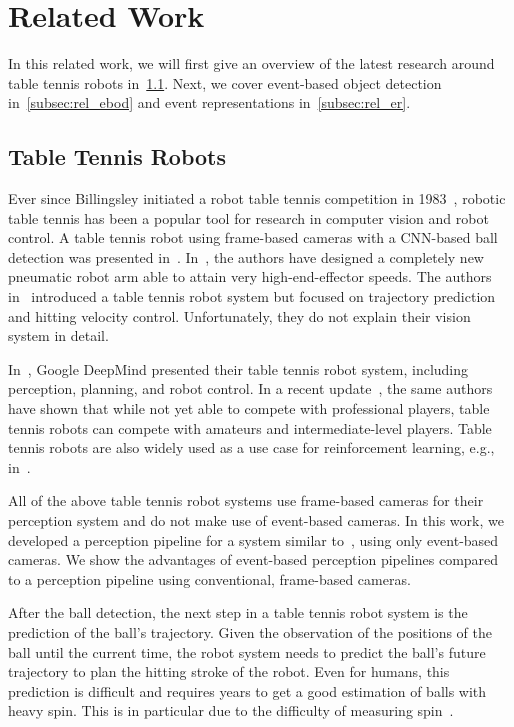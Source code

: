 \section{Related Work}
In this related work, we will first give an overview of the latest research around table tennis robots in~\cref{subsec:rl_ttr}.
%
Next, we cover event-based object detection in~\cref{subsec:rel_ebod} and event representations in~\cref{subsec:rel_er}.

\subsection{Table Tennis Robots}\label{subsec:rl_ttr}

Ever since Billingsley initiated a robot table tennis competition in 1983~\cite{Billingsley1983robot}, robotic table tennis has been a popular tool for research in computer vision and robot control.
%
A table tennis robot using frame-based cameras with a \ac{CNN}-based ball detection was presented in~\cite{GomezGonzalez2019robotics}.
In~\cite{Buchler2022tor}, the authors have designed a completely new pneumatic robot arm able to attain very high-end-effector speeds.
%
The authors in~\cite{Ji2021iros} introduced a table tennis robot system but focused on trajectory prediction and hitting velocity control.
%
Unfortunately, they do not explain their vision system in detail.

In~\cite{DAmbrosio2023rss}, Google DeepMind presented their table tennis robot system, including perception, planning, and robot control.
%
In a recent update~\cite{Ambrosio2024arxiv}, the same authors have shown that while not yet able to compete with professional players, table tennis robots can compete with amateurs and intermediate-level players.
%
Table tennis robots are also widely used as a use case for reinforcement learning, e.g., in~\cite{DAmbrosio2023rss}\cite{Ding2022iros}\cite{Yang2021ieee}\cite{Gao2020iros}.

All of the above table tennis robot systems use frame-based cameras for their perception system and do not make use of event-based cameras.
%
In this work, we developed a perception pipeline for a system similar to~\cite{Tebbe2019gcpr}, using only event-based cameras.
%
We show the advantages of event-based perception pipelines compared to a perception pipeline using conventional, frame-based cameras.

After the ball detection, the next step in a table tennis robot system is the prediction of the ball's trajectory.
%
Given the observation of the positions of the ball until the current time, the robot system needs to predict the ball's future trajectory to plan the hitting stroke of the robot.
%
Even for humans, this prediction is difficult and requires years to get a good estimation of balls with heavy spin.
%
This is in particular due to the difficulty of measuring spin~\cite{Tebbe2019gcpr}.

